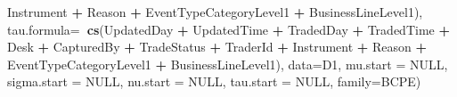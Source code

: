 \documentclass[]{article}
\newenvironment{Shaded}{\begin{snugshade}}{\end{snugshade}}
\newcommand{\KeywordTok}[1]{\textcolor[rgb]{0.13,0.29,0.53}{\textbf{#1}}}
\newcommand{\DataTypeTok}[1]{\textcolor[rgb]{0.13,0.29,0.53}{#1}}
\newcommand{\StringTok}[1]{\textcolor[rgb]{0.31,0.60,0.02}{#1}}
\newcommand{\OtherTok}[1]{\textcolor[rgb]{0.56,0.35,0.01}{#1}}
\newcommand{\OperatorTok}[1]{\textcolor[rgb]{0.81,0.36,0.00}{\textbf{#1}}}
\newcommand{\NormalTok}[1]{#1}
\begin{document}
\begin{Shaded}
\begin{Highlighting}[]
\StringTok{              }\NormalTok{Instrument }\OperatorTok{+}\StringTok{ }\NormalTok{Reason }\OperatorTok{+}\StringTok{ }\NormalTok{EventTypeCategoryLevel1 }\OperatorTok{+}\StringTok{ }
\StringTok{              }\NormalTok{BusinessLineLevel1),}
 \DataTypeTok{tau.formula=}\OperatorTok{~}\KeywordTok{cs}\NormalTok{(UpdatedDay }\OperatorTok{+}\StringTok{ }\NormalTok{UpdatedTime }\OperatorTok{+}\StringTok{ }\NormalTok{TradedDay }\OperatorTok{+}\StringTok{ }\NormalTok{TradedTime}
                \OperatorTok{+}\StringTok{ }\NormalTok{Desk }\OperatorTok{+}\StringTok{ }\NormalTok{CapturedBy }\OperatorTok{+}\StringTok{ }\NormalTok{TradeStatus }\OperatorTok{+}\StringTok{ }\NormalTok{TraderId }\OperatorTok{+}
\StringTok{                }\NormalTok{Instrument }\OperatorTok{+}\StringTok{ }\NormalTok{Reason }\OperatorTok{+}\StringTok{ }\NormalTok{EventTypeCategoryLevel1 }\OperatorTok{+}
\StringTok{                }\NormalTok{BusinessLineLevel1),}
\DataTypeTok{data=}\NormalTok{D1, }\DataTypeTok{mu.start =} \OtherTok{NULL}\NormalTok{,  }\DataTypeTok{sigma.start =} \OtherTok{NULL}\NormalTok{, }\DataTypeTok{nu.start =} \OtherTok{NULL}\NormalTok{,}
                              \DataTypeTok{tau.start =} \OtherTok{NULL}\NormalTok{, }\DataTypeTok{family=}\NormalTok{BCPE)}
\end{Highlighting}
\end{Shaded}

\doublespacing

\singlespacing
\end{document}
